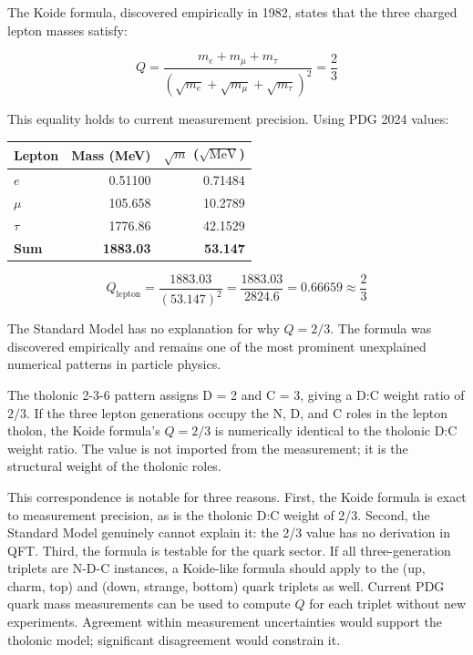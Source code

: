 \documentclass[
  11pt,
  letterpaper,
]{article}
\begin{document}
The Koide formula, discovered empirically in 1982, states that the three
charged lepton masses satisfy:

\[Q = \frac{m_e + m_\mu + m_\tau}{(\sqrt{m_e} + \sqrt{m_\mu} + \sqrt{m_\tau})^2} = \frac{2}{3}\]

This equality holds to current measurement precision. Using PDG 2024
values:

\begin{longtable}[]{@{}lrr@{}}
\toprule\noalign{}
Lepton & Mass (MeV) & \(\sqrt{m}\) (\(\sqrt{\text{MeV}}\)) \\
\midrule\noalign{}
\endhead
\bottomrule\noalign{}
\endlastfoot
\(e\) & 0.51100 & 0.71484 \\
\(\mu\) & 105.658 & 10.2789 \\
\(\tau\) & 1776.86 & 42.1529 \\
\textbf{Sum} & \textbf{1883.03} & \textbf{53.147} \\
\end{longtable}

\[Q_\text{lepton} = \frac{1883.03}{(53.147)^2} = \frac{1883.03}{2824.6} = 0.66659 \approx \frac{2}{3}\]

The Standard Model has no explanation for why \(Q = 2/3\). The formula
was discovered empirically and remains one of the most prominent
unexplained numerical patterns in particle physics.

The tholonic 2-3-6 pattern assigns D = 2 and C = 3, giving a D:C weight
ratio of \(2/3\). If the three lepton generations occupy the N, D, and C
roles in the lepton tholon, the Koide formula's \(Q = 2/3\) is
numerically identical to the tholonic D:C weight ratio. The value is not
imported from the measurement; it is the structural weight of the
tholonic roles.

This correspondence is notable for three reasons. First, the Koide
formula is exact to measurement precision, as is the tholonic D:C weight
of 2/3. Second, the Standard Model genuinely cannot explain it: the 2/3
value has no derivation in QFT. Third, the formula is testable for the
quark sector. If all three-generation triplets are N-D-C instances, a
Koide-like formula should apply to the (up, charm, top) and (down,
strange, bottom) quark triplets as well. Current PDG quark mass
measurements can be used to compute \(Q\) for each triplet without new
experiments. Agreement within measurement uncertainties would support
the tholonic model; significant disagreement would constrain it.
\end{document}
